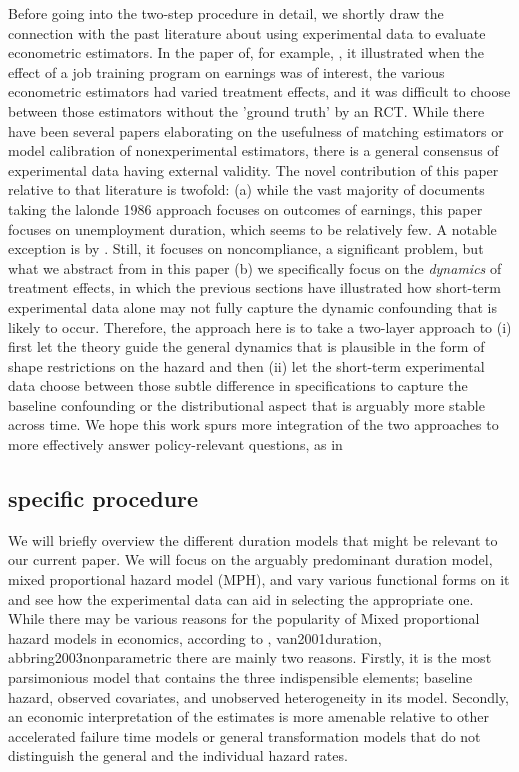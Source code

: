 \documentclass[uplatex,dvipdfmx]{jsarticle}
\begin{document}
Before going into the two-step procedure in detail, we shortly draw the connection with the past literature about using experimental data to evaluate econometric estimators. In the paper of, for example, \cite{lalonde1986evaluating}, it illustrated when the effect of a job training program on earnings was of interest, the various econometric estimators had varied treatment effects, and it was difficult to choose between those estimators without the 'ground truth' by an RCT. While there have been several papers elaborating on the usefulness of matching estimators or model calibration \cite{heckman1997matching,heckman1998characterizing} of nonexperimental estimators, there is a general consensus of experimental data having external validity.
The novel contribution of this paper relative to that literature is twofold: (a) while the vast majority of documents taking the %
{lalonde 1986} approach focuses on outcomes of earnings, this paper focuses on unemployment duration, which seems to be relatively few. A notable exception is by \cite{ham1996effect}. Still, it focuses on noncompliance, a significant problem, but what we abstract from in this paper (b) we specifically focus on the \textit{dynamics  }of treatment effects, in which the previous sections have illustrated how short-term experimental data alone may not fully capture the dynamic confounding that is likely to occur. Therefore, the approach here is to take a two-layer approach to (i) first let the theory guide the general dynamics that is plausible in the form of shape restrictions on the hazard and then (ii) let the short-term experimental data choose between those subtle difference in specifications to capture the baseline confounding or the distributional aspect that is arguably more stable across time. We hope this work spurs more integration of the two approaches to more effectively answer policy-relevant questions, as in \cite{todd2020best}

\subsection{specific procedure}
We will briefly overview the different duration models that might be relevant to our current paper.  We will focus on the arguably predominant duration model, mixed proportional hazard model (MPH), and vary various functional forms on it and see how the experimental data can aid in selecting the appropriate one.\\
While there may be various reasons for the popularity of Mixed proportional hazard models in economics, according to \cite{heckman1984method}, van2001duration, abbring2003nonparametric there are mainly two reasons.
Firstly,  it is the most parsimonious model that contains the three indispensible elements; baseline hazard, observed covariates, and unobserved heterogeneity in its model. Secondly, an economic interpretation of the estimates is more amenable relative to other accelerated failure time models or general transformation models that do not distinguish the general and the individual hazard rates.
\end{document}
